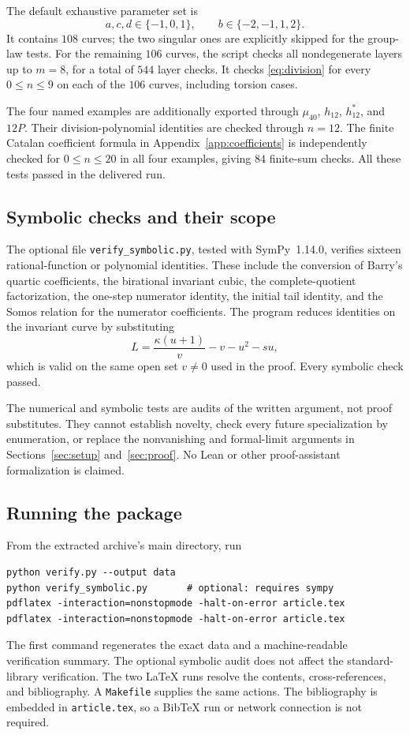 \documentclass[11pt,letterpaper]{article}
\numberwithin{equation}{section}
\theoremstyle{definition}
\theoremstyle{remark}
\begin{document}
The default exhaustive parameter set is
\begin{equation}\label{eq:testgrid}
 a,c,d\in\{-1,0,1\},\qquad b\in\{-2,-1,1,2\}.
\end{equation}
It contains $108$ curves; the two singular ones are explicitly skipped
for the group-law tests. For the remaining $106$ curves, the script
checks all nondegenerate layers up to $m=8$, for a total of $544$
layer checks. It checks \eqref{eq:division} for every $0\le n\le9$
on each of the $106$ curves, including torsion cases.

The four named examples are additionally exported through $\mu_{40}$,
$h_{12}$, $h_{12}^*$, and $12P$. Their division-polynomial identities
are checked through $n=12$. The finite Catalan coefficient formula in
Appendix~\ref{app:coefficients} is independently checked for
$0\le n\le20$ in all four examples, giving $84$ finite-sum checks.
All these tests passed in the delivered run.

\subsection{Symbolic checks and their scope}
The optional file \texttt{verify\_symbolic.py}, tested with SymPy~1.14.0,
verifies sixteen rational-function or polynomial identities. These include
the conversion of Barry's quartic coefficients, the birational invariant
cubic, the complete-quotient factorization, the one-step numerator identity,
the initial tail identity, and the Somos relation for the numerator
coefficients. The program reduces identities on the invariant curve by
substituting
\[
 L=\frac{\kappa(u+1)}v-v-u^2-su,
\]
which is valid on the same open set $v\ne0$ used in the proof.
Every symbolic check passed.

The numerical and symbolic tests are audits of the written argument, not
proof substitutes. They cannot establish novelty, check every future
specialization by enumeration, or replace the nonvanishing and formal-limit
arguments in Sections~\ref{sec:setup} and~\ref{sec:proof}. No Lean or other
proof-assistant formalization is claimed.

\subsection{Running the package}
From the extracted archive's main directory, run
\begin{verbatim}
python verify.py --output data
python verify_symbolic.py       # optional: requires sympy
pdflatex -interaction=nonstopmode -halt-on-error article.tex
pdflatex -interaction=nonstopmode -halt-on-error article.tex
\end{verbatim}
The first command regenerates the exact data and a machine-readable
verification summary. The optional symbolic audit does not affect the
standard-library verification. The two LaTeX runs resolve the contents,
cross-references, and bibliography. A \texttt{Makefile} supplies the same
actions. The bibliography is embedded in \texttt{article.tex}, so a BibTeX
run or network connection is not required.
\end{document}
